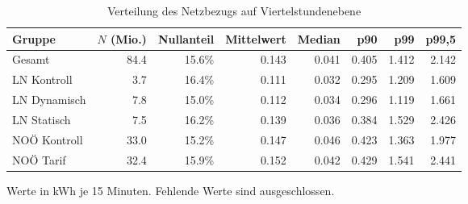 \begin{table}[H]
\centering
\caption{Verteilung des Netzbezugs auf Viertelstundenebene}
\label{tab:consumption_15m_distribution}
\begin{tabular}{lrrrrrrr}
\toprule
Gruppe & $N$ (Mio.) & Nullanteil & Mittelwert & Median & p90 & p99 & p99,5 \\
\midrule
Gesamt & 84.4 & 15.6\% & 0.143 & 0.041 & 0.405 & 1.412 & 2.142 \\
LN Kontroll & 3.7 & 16.4\% & 0.111 & 0.032 & 0.295 & 1.209 & 1.609 \\
LN Dynamisch & 7.8 & 15.0\% & 0.112 & 0.034 & 0.296 & 1.119 & 1.661 \\
LN Statisch & 7.5 & 16.2\% & 0.139 & 0.036 & 0.384 & 1.529 & 2.426 \\
NOÖ Kontroll & 33.0 & 15.2\% & 0.147 & 0.046 & 0.423 & 1.363 & 1.977 \\
NOÖ Tarif & 32.4 & 15.9\% & 0.152 & 0.042 & 0.429 & 1.541 & 2.441 \\
\bottomrule
\end{tabular}
\begin{flushleft}
\footnotesize Werte in kWh je 15 Minuten. Fehlende Werte sind ausgeschlossen.
\end{flushleft}
\end{table}
